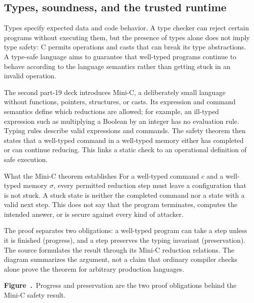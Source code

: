 \documentclass[11pt,a4paper]{article}
\numberwithin{figure}{section}
\newcommand{\diagramcaption}[1]{\par\smallskip\refstepcounter{figure}\begin{center}\small\textbf{Figure~\thefigure.}~#1\end{center}}
\begin{document}
\subsection{Types, soundness, and the trusted runtime}
Types specify expected data and code behavior. A type checker can reject certain programs without executing them, but the presence of types alone does not imply type safety: C permits operations and casts that can break its type abstractions. A type-safe language aims to guarantee that well-typed programs continue to behave according to the language semantics rather than getting stuck in an invalid operation.

The second part-19 deck introduces Mini-C, a deliberately small language without functions, pointers, structures, or casts. Its expression and command semantics define which reductions are allowed; for example, an ill-typed expression such as multiplying a Boolean by an integer has no evaluation rule. Typing rules describe valid expressions and commands. The safety theorem then states that a well-typed command in a well-typed memory either has completed or can continue reducing. This links a static check to an operational definition of safe execution.

\begin{concept}{What the Mini-C theorem establishes}
For a well-typed command $c$ and a well-typed memory $\sigma$, every permitted reduction step must leave a configuration that is not stuck. A stuck state is neither the completed command nor a state with a valid next step. This does not say that the program terminates, computes the intended answer, or is secure against every kind of attacker.
\end{concept}

The proof separates two obligations: a well-typed program can take a step unless it is finished (progress), and a step preserves the typing invariant (preservation). The source formulates the result through its Mini-C reduction relations. The diagram summarizes the argument, not a claim that ordinary compiler checks alone prove the theorem for arbitrary production languages.
\begin{center}\end{center}
\diagramcaption{Progress and preservation are the two proof obligations behind the Mini-C safety result.}
\end{document}
